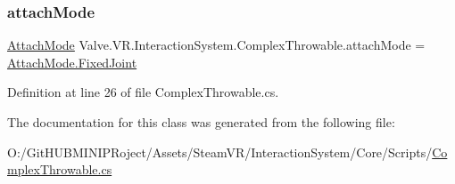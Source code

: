 \mbox{\label{class_valve_1_1_v_r_1_1_interaction_system_1_1_complex_throwable_a58b4bbb34394f119cfcf82f94a241cb1}} 
\subsubsection{\texorpdfstring{attachMode}{attachMode}}
{\footnotesize\ttfamily \mbox{\hyperlink{class_valve_1_1_v_r_1_1_interaction_system_1_1_complex_throwable_a3767479e716ee64bf8f7b2d5d46c67b7}{Attach\+Mode}} Valve.\+V\+R.\+Interaction\+System.\+Complex\+Throwable.\+attach\+Mode = \mbox{\hyperlink{class_valve_1_1_v_r_1_1_interaction_system_1_1_complex_throwable_a3767479e716ee64bf8f7b2d5d46c67b7a745602638f184063907e534fc67cf1f8}{Attach\+Mode.\+Fixed\+Joint}}}



Definition at line 26 of file Complex\+Throwable.\+cs.



The documentation for this class was generated from the following file\+:\begin{DoxyCompactItemize}
\item 
O\+:/\+Git\+H\+U\+B\+M\+I\+N\+I\+P\+Roject/\+Assets/\+Steam\+V\+R/\+Interaction\+System/\+Core/\+Scripts/\mbox{\hyperlink{_complex_throwable_8cs}{Complex\+Throwable.\+cs}}\end{DoxyCompactItemize}
